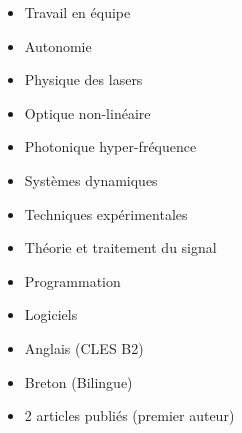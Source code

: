 

\vspace{-0.1em}

\begin{itemize}
\item Travail en équipe
\item Autonomie

\end{itemize}





\divider

\begin{itemize}
	\item {Physique des lasers}
	\item {Optique non-linéaire}
	\item {Photonique hyper-fréquence}
	\item {Systèmes dynamiques}
	\item {Techniques expérimentales}
	\item {Théorie et traitement du signal}
\end{itemize}

\divider


\begin{itemize}
\item Programmation

\smallskip
{}	

\medskip

\item Logiciels

\smallskip
{}
\end{itemize}

\divider


\begin{itemize}

\item Anglais (CLES B2)
\item Breton (Bilingue)

\end{itemize}

\medskip
{}

\begin{itemize}
	\item 2 articles publiés (premier auteur)
\end{itemize}

